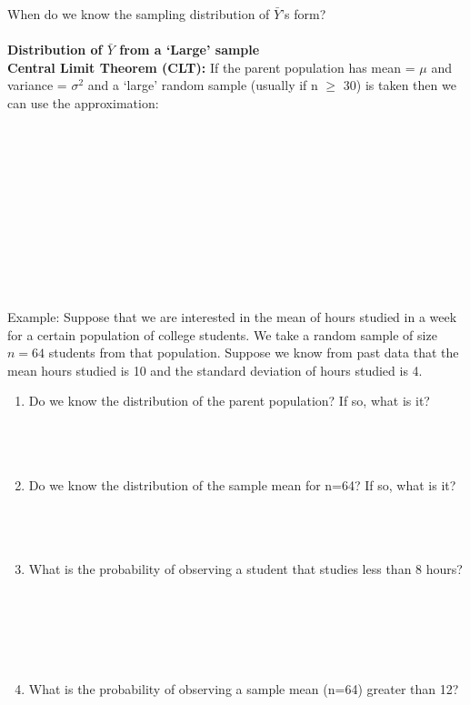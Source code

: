 \newpage

When do we know the sampling distribution of $\bar{Y}$'s form?\\~\\
\large \textbf{Distribution of $\bar{Y}$ from a `Large' sample} \normalsize\\
\textbf{Central Limit Theorem (CLT):}  If the parent population has mean = $\mu$ and variance = $\sigma^2$ and a `large' random sample (usually if n $\geq$ 30) is taken then we can use the approximation:\\~\\~\\~\\~\\~\\~\\~\\~\\~\\~\\~\\

Example:  Suppose that we are interested in the mean of hours studied in a week for a certain population of college students.  We take a random sample of size $n=64$ students from that population.  Suppose we know from past data that the mean hours studied is 10 and the standard deviation of hours studied is 4.
\begin{enumerate}
\item Do we know the distribution of the parent population?  If so, what is it?\\~\\~\\~\\
\item Do we know the distribution of the sample mean for n=64?  If so, what is it? \\~\\~\\~\\
\item What is the probability of observing a student that studies less than 8 hours?\\~\\~\\~\\~\\~\\
\item What is the probability of observing a sample mean (n=64) greater than 12?\\~\\~\\~\\~\\~\\~\\~\\
\end{enumerate}


